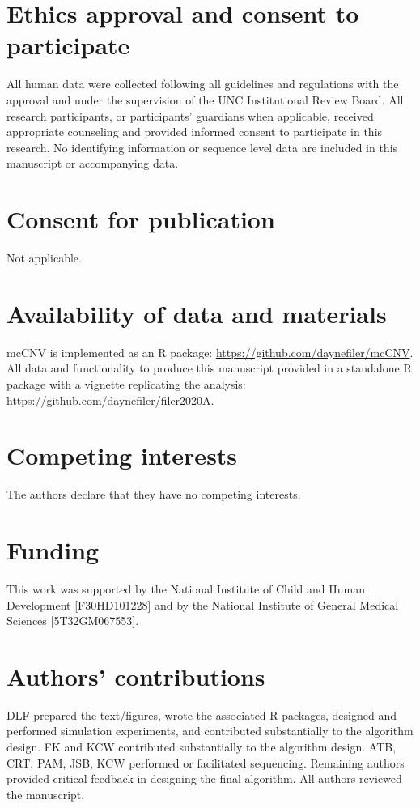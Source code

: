 \documentclass{bmcart}\usepackage[]{graphicx}\usepackage[]{color}
\begin{document}
\begin{backmatter}

\section*{Ethics approval and consent to participate}%
All human data were collected following all guidelines and regulations with the approval and under the supervision of the UNC Institutional Review Board.
All research participants, or participants' guardians when applicable, received appropriate counseling and provided informed consent to participate in this research.
No identifying information or sequence level data are included in this manuscript or accompanying data.

\section*{Consent for publication}
Not applicable.

\section*{Availability of data and materials}%
mcCNV is implemented as an R package: \url{https://github.com/daynefiler/mcCNV}. All data and functionality to produce this manuscript provided in a standalone R package with a vignette replicating the analysis: \url{https://github.com/daynefiler/filer2020A}.

\section*{Competing interests}
The authors declare that they have no competing interests.

\section*{Funding}%
This work was supported by the National Institute of Child and Human Development [F30HD101228] and by the National Institute of General Medical Sciences [5T32GM067553].

\section*{Authors' contributions}
DLF prepared the text/figures, wrote the associated R packages, designed and performed simulation experiments, and contributed substantially to the algorithm design. FK and KCW contributed substantially to the algorithm design. ATB, CRT, PAM, JSB, KCW performed or facilitated sequencing. Remaining authors provided critical feedback in designing the final algorithm. All authors reviewed the manuscript.


\end{backmatter}
\end{document}
